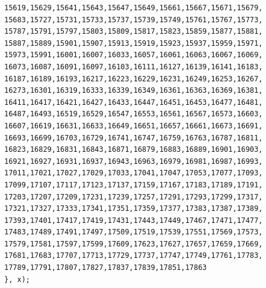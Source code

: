 \documentclass{article}
\begin{document}
\begin{lstlisting}[caption=\texttt{maths.lib}]
15619,15629,15641,15643,15647,15649,15661,15667,15671,15679,
15683,15727,15731,15733,15737,15739,15749,15761,15767,15773,
15787,15791,15797,15803,15809,15817,15823,15859,15877,15881,
15887,15889,15901,15907,15913,15919,15923,15937,15959,15971,
15973,15991,16001,16007,16033,16057,16061,16063,16067,16069,
16073,16087,16091,16097,16103,16111,16127,16139,16141,16183,
16187,16189,16193,16217,16223,16229,16231,16249,16253,16267,
16273,16301,16319,16333,16339,16349,16361,16363,16369,16381,
16411,16417,16421,16427,16433,16447,16451,16453,16477,16481,
16487,16493,16519,16529,16547,16553,16561,16567,16573,16603,
16607,16619,16631,16633,16649,16651,16657,16661,16673,16691,
16693,16699,16703,16729,16741,16747,16759,16763,16787,16811,
16823,16829,16831,16843,16871,16879,16883,16889,16901,16903,
16921,16927,16931,16937,16943,16963,16979,16981,16987,16993,
17011,17021,17027,17029,17033,17041,17047,17053,17077,17093,
17099,17107,17117,17123,17137,17159,17167,17183,17189,17191,
17203,17207,17209,17231,17239,17257,17291,17293,17299,17317,
17321,17327,17333,17341,17351,17359,17377,17383,17387,17389,
17393,17401,17417,17419,17431,17443,17449,17467,17471,17477,
17483,17489,17491,17497,17509,17519,17539,17551,17569,17573,
17579,17581,17597,17599,17609,17623,17627,17657,17659,17669,
17681,17683,17707,17713,17729,17737,17747,17749,17761,17783,
17789,17791,17807,17827,17837,17839,17851,17863
}, x);
\end{lstlisting}
\end{document}

